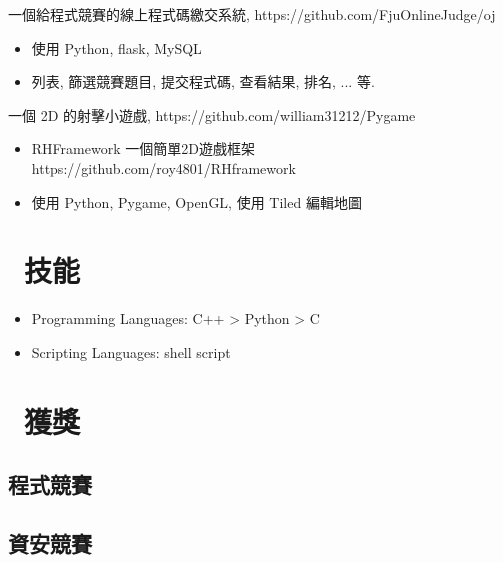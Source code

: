 \documentclass{resume}
\begin{document}
一個給程式競賽的線上程式碼繳交系統, {\small https://github.com/FjuOnlineJudge/oj}
\begin{itemize}
  \item 使用 Python, flask, MySQL
  \item 列表, 篩選競賽題目, 提交程式碼, 查看結果, 排名, ... 等.
\end{itemize}

一個 2D 的射擊小遊戲, {\small https://github.com/william31212/Pygame}
\begin{itemize}
  \item RHFramework 一個簡單2D遊戲框架 {\small https://github.com/roy4801/RHframework}
  \item 使用 Python, Pygame, OpenGL, 使用 Tiled 編輯地圖 
\end{itemize}

\section{\faCogs\ 技能}
\begin{itemize}[parsep=0.5ex]
  \item Programming Languages: C++ > Python > C 
  \item Scripting Languages: shell script
\end{itemize}

\section{\faTrophy\ 獲獎}

\subsection{程式競賽}

\subsection{資安競賽}
\end{document}
